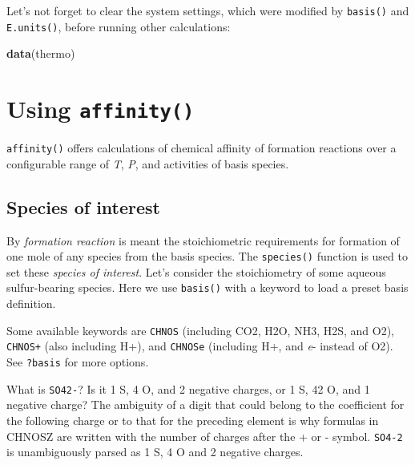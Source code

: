 \documentclass[]{tufte-book}
\newenvironment{Shaded}{}{}
\newcommand{\KeywordTok}[1]{\textcolor[rgb]{0.00,0.44,0.13}{\textbf{#1}}}
\newcommand{\NormalTok}[1]{#1}
\begin{document}
Let's not forget to clear the system settings, which were modified by
{\texttt{basis()}} and {\texttt{E.units()}}, before running other
calculations:

\begin{Shaded}
\begin{Highlighting}[]
\KeywordTok{data}\NormalTok{(thermo)}
\end{Highlighting}
\end{Shaded}

\chapter{\texorpdfstring{Using
{\texttt{affinity()}}}{Using affinity()}}\label{using-affinity}

{\texttt{affinity()}} offers calculations of chemical affinity of
formation reactions over a configurable range of \emph{T}, \emph{P}, and
activities of basis species.

\hypertarget{species-of-interest}{\section{Species of
interest}\label{species-of-interest}}

By \emph{formation reaction} is meant the stoichiometric requirements
for formation of one mole of any species from the basis species. The
{\texttt{species()}} function is used to set these \emph{species of
interest}. Let's consider the stoichiometry of some aqueous
sulfur-bearing species. Here we use {\texttt{basis()}} with a keyword to
load a preset basis definition.

\begin{marginfigure}
Some available keywords are \texttt{CHNOS} (including CO2, H2O, NH3,
H2S, and O2), \texttt{CHNOS+} (also including H+), and \texttt{CHNOSe}
(including H+, and \emph{e}- instead of O2). See {\texttt{?basis}} for
more options.
\end{marginfigure}\begin{marginfigure}
What is \texttt{SO42-}? Is it 1 S, 4 O, and 2 negative charges, or 1 S,
42 O, and 1 negative charge? The ambiguity of a digit that could belong
to the coefficient for the following charge or to that for the preceding
element is why formulas in CHNOSZ are written with the number of charges
after the + or - symbol. \texttt{SO4-2} is unambiguously parsed as 1 S,
4 O and 2 negative charges.
\end{marginfigure}
\end{document}
